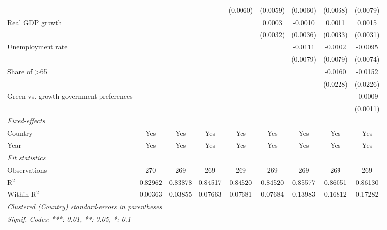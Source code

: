 \begin{table}[htbp]
\begin{tabular}{lcccccccc}
                                                      &          &          &          & (0.0060) & (0.0059) & (0.0060) & (0.0068) & (0.0079)\\   
      Real GDP growth                                 &          &          &          &          & 0.0003   & -0.0010  & 0.0011   & 0.0015\\   
                                                      &          &          &          &          & (0.0032) & (0.0036) & (0.0033) & (0.0031)\\   
      Unemployment rate                               &          &          &          &          &          & -0.0111  & -0.0102  & -0.0095\\   
                                                      &          &          &          &          &          & (0.0079) & (0.0079) & (0.0074)\\   
      Share of >65                                    &          &          &          &          &          &          & -0.0160  & -0.0152\\   
                                                      &          &          &          &          &          &          & (0.0228) & (0.0226)\\   
      Green vs. growth government preferences         &          &          &          &          &          &          &          & -0.0009\\   
                                                      &          &          &          &          &          &          &          & (0.0011)\\   
      \midrule
      \emph{Fixed-effects}\\
      Country                                         & Yes      & Yes      & Yes      & Yes      & Yes      & Yes      & Yes      & Yes\\  
      Year                                            & Yes      & Yes      & Yes      & Yes      & Yes      & Yes      & Yes      & Yes\\  
      \midrule
      \emph{Fit statistics}\\
      Observations                                    & 270      & 269      & 269      & 269      & 269      & 269      & 269      & 269\\  
      R$^2$                                           & 0.82962  & 0.83878  & 0.84517  & 0.84520  & 0.84520  & 0.85577  & 0.86051  & 0.86130\\  
      Within R$^2$                                    & 0.00363  & 0.03855  & 0.07663  & 0.07681  & 0.07684  & 0.13983  & 0.16812  & 0.17282\\  
      \midrule \midrule
      \multicolumn{9}{l}{\emph{Clustered (Country) standard-errors in parentheses}}\\
      \multicolumn{9}{l}{\emph{Signif. Codes: ***: 0.01, **: 0.05, *: 0.1}}\\
   \end{tabular}
\end{table}


